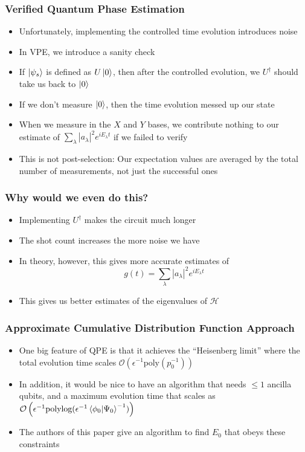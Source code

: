 \documentclass[aspectratio=169]{beamer}
\begin{document}
\begin{frame}
\frametitle{Verified Quantum Phase Estimation}
\begin{itemize}[<+->]
\item Unfortunately, implementing the controlled time evolution introduces noise\item In VPE, we introduce a sanity check
\item If $\ket{\psi_s}$ is defined as $U\ket{0}$, then after the controlled evolution, we $U^\dagger$ should take us back to $\ket{0}$
\item If we don't measure $\ket{0}$, then the time evolution messed up our state
\item When we measure in the $X$ and $Y$ bases, we contribute nothing to our estimate of $\sum_{\lambda}|a_\lambda|^2 e^{iE_\lambda t}$ if we failed to verify
\item This is not post-selection: Our expectation values are averaged by the total number of measurements, not just the successful ones
\end{itemize} 
\end{frame}

\begin{frame}
\frametitle{Why would we even do this?}
\begin{itemize}[<+->]
\item Implementing $U^{\dagger}$ makes the circuit much longer
\item The shot count increases the more noise we have
\item In theory, however, this gives more accurate estimates of
\begin{equation}
g(t) = \sum_{\lambda}|a_\lambda|^2 e^{iE_\lambda t}
\end{equation}
\item This gives us better estimates of the eigenvalues of $\mathcal{H}$
\end{itemize}
\end{frame}

\begin{frame}
\frametitle{Approximate Cumulative Distribution Function Approach }
\begin{itemize}[<+->]
\item One big feature of QPE is that it achieves the ``Heisenberg limit'' where the total evolution time scales $\mathcal{O}\left(\epsilon^{-1}\text{poly}(p_0^{-1})\right)$
\item In addition, it would be nice to have an algorithm that needs $\leq 1$ ancilla qubits, and a maximum evolution time that scales as $\mathcal{O}\left(\epsilon^{-1}\text{polylog}(\epsilon^{-1}\braket{\phi_0|\Psi_0}^{-1})\right)$
\item The authors of this paper give an algorithm to find $E_0$ that obeys these constraints
\end{itemize}
\end{frame}
\end{document}
